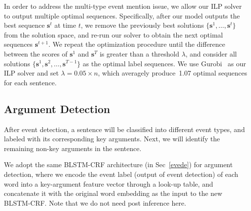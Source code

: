 In order to address the multi-type event mention issue, we allow our ILP solver to output multiple optimal sequences. 
Specifically, after our model outputs the best sequence $\bm{s}^t$ at time $t$, we remove the previously best solutions 
 $\{\bm{s}^1, \ldots, \bm{s}^{t}\}$ from the solution space, and re-run our solver to obtain the next optimal sequences $\bm{s}^{t+1}$. 
We repeat the optimization procedure until the difference between the scores of $\bm{s}^1$ and $\bm{s}^T$ is greater 
than a threshold $\lambda$, and consider all solutions $\{\bm{s}^1, \bm{s}^2, \ldots, \bm{s}^{T-1}\}$ as the optimal label sequences. 
We use Gurobi~\cite{gurobi} as our ILP solver and set $\lambda=0.05 \times n$, which averagely produce~1.07 optimal sequences for each sentence. 

\subsection{Argument Detection}
After event detection, a sentence will be classified into different event types, and labeled with its corresponding key arguments. 
Next, we will identify the remaining non-key arguments in the sentence. 

We adopt the same BLSTM-CRF architecture (in Sec~\ref{evede}) for argument detection, where we encode the event label (output of event detection) of each word into a key-argument feature vector through a look-up table, and concatenate it with the original word embedding as the input to the new BLSTM-CRF. Note that we do not need post inference here.
